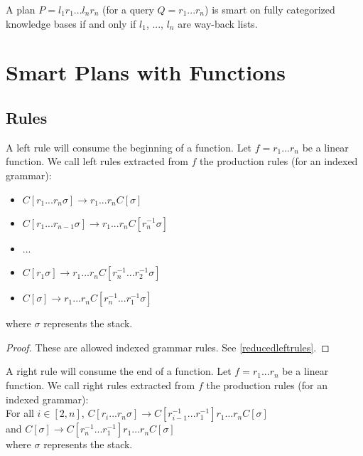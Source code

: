 \documentclass[10pt,a4paper,draft]{article}
\begin{document}
\begin{Corrollary}
A plan $P = l_1 r_1 ... l_n r_n $ (for a query $Q = r_1 ... r_n$) is smart on fully categorized knowledge bases if and only if $l_1$, ..., $l_n$ are way-back lists.
\end{Corrollary}

\section{Smart Plans with Functions}

\subsection{Rules}

\begin{definition}
\label{leftrule}
A left rule will consume the beginning of a function. Let $f=r_1...r_n$ be a linear function. We call left rules extracted from $f$ the production rules (for an indexed grammar):
\begin{itemize}
\item $C[r_1...r_n \sigma] \rightarrow r_1 ... r_n C[\sigma]$
\item $C[r_1...r_{n-1} \sigma] \rightarrow r_1 ... r_n C[r_{n}^{-1} \sigma]$
\item ...
\item $C[r_1 \sigma] \rightarrow r_1 ... r_n C[r_{n}^{-1} ... r_2^{-1} \sigma]$
\item $C[\sigma] \rightarrow r_1 ... r_n C[r_{n}^{-1} ... r_1^{-1} \sigma]$
\end{itemize}
where $\sigma$ represents the stack.
\end{definition}

\begin{proof}
These are allowed indexed grammar rules. See \ref{reducedleftrules}.
\end{proof}

\begin{definition}
\label{rightrule}
A right rule will consume the end of a function. Let $f=r_1...r_n$ be a linear function. We call right rules extracted from $f$ the production rules (for an indexed grammar):\\
For all $i \in [2, n]$, $C[r_i...r_n \sigma] \rightarrow C[r_{i-1}^{-1} ... r_1^{-1}] r_1 ... r_n C[\sigma]$ \\
and $C[\sigma] \rightarrow C[r_{n}^{-1} ... r_1^{-1}] r_1 ... r_n C[\sigma]$ \\
where $\sigma$ represents the stack.
\end{definition}
\end{document}
